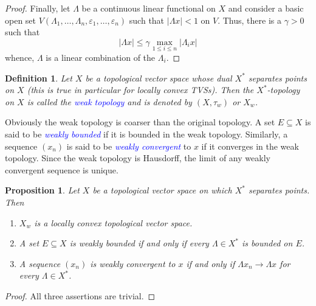 \documentclass[12pt]{article}
\theoremstyle{thmstyle}
\newtheorem{proposition}[theorem]{Proposition}
\theoremstyle{defstyle}
\newtheorem{definition}[theorem]{Definition}
\newcommand{\define}[1]{\textcolor{blue}{\textit{#1}}}
\renewcommand{\le}{\leqslant}
\begin{document}
\begin{proof}
    Finally, let $\Lambda$ be a continuous linear functional on $X$ and consider a basic open set $V(\Lambda_1,\dots,\Lambda_n,\varepsilon_1,\dots,\varepsilon_n)$ such that $|\Lambda x| <1$ on $V$. Thus, there is a $\gamma > 0$ such that 
    \begin{equation*}
        |\Lambda x|\le\gamma\max_{1\le i\le n}|\Lambda_i x|
    \end{equation*}
    whence, $\Lambda$ is a linear combination of the $\Lambda_i$.
\end{proof}

\begin{definition}
    Let $X$ be a topological vector space whose dual $X^\ast$ separates points on $X$ (this is true in particular for locally convex TVSs). Then the $X^\ast$-topology on $X$ is called the \define{weak topology} and is denoted by $(X, \tau_w)$ or $X_w$.
\end{definition}

Obviously the weak topology is coarser than the original topology. A set $E\subseteq X$ is said to be \define{weakly bounded} if it is bounded in the weak topology. Similarly, a sequence $(x_n)$ is said to be \define{weakly convergent} to $x$ if it converges in the weak topology. Since the weak topology is Hausdorff, the limit of any weakly convergent sequence is unique.

\begin{proposition}
    Let $X$ be a topological vector space on which $X^\ast$ separates points. Then 
    \begin{enumerate}[label=(\alph*)]
        \item $X_w$ is a locally convex topological vector space. 
        \item A set $E\subseteq X$ is weakly bounded if and only if every $\Lambda\in X^\ast$ is bounded on $E$. 
        \item A sequence $(x_n)$ is weakly convergent to $x$ if and only if $\Lambda x_n\to \Lambda x$ for every $\Lambda\in X^\ast$.
    \end{enumerate}
\end{proposition}
\begin{proof}
    All three assertions are trivial.
\end{proof}
\end{document}
